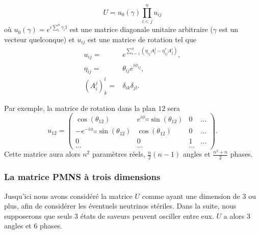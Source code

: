             \begin{equation}\label{eq::compact_pmns}
                U=u_0(\gamma)\prod_{i<j}^n u_{ij}
            \end{equation}
            où $u_0(\gamma)=e^{i \sum_{i}^{n}\gamma_i \mathbb{I}}$ est une matrice diagonale unitaire arbitraire ($\gamma$ est un vecteur quelconque) et $u_{ij}$ est une matrice de rotation tel que
            \begin{equation}
                \begin{split}
                    u_{ij}= & e^{\sum_{i=1}^n\left(\eta_{ij}A_i^j-\eta_{ij}^*A_j^i\right)},\\
                    \eta_{ij} = & \theta_{ij}e^{i\phi_{ij}},\\
                    \left(A_i^j\right)_k^l = & \delta_{ik}\delta_{jl}.
                \end{split}
            \end{equation}
            
            Par exemple, la matrice de rotation dans la plan $12$ sera
            \begin{equation}
                u_{12} = 
                \left(\begin{matrix}
                    \cos(\theta_{12}) & e^{i\phi_{12}}\sin(\theta_{12}) & 0 & ... \\
                    -e^{-i\phi_{12}}\sin(\theta_{12}) & \cos(\theta_{12}) & 0 & ... \\
                    0 & 0 & 1 & ... \\
                    ... & ... & ... &
                \end{matrix}\right).
            \end{equation}
            Cette matrice aura alors $n^2$ paramètres réels, $\frac{n}{2}(n-1)$ angles  et $\frac{n^2+n}{2}$ phases.
            
            \subsubsection{La matrice PMNS à trois dimensions}
            Jusqu'ici nous avons considéré la matrice $U$ comme ayant une dimension de 3 ou plus, afin de considérer les éventuels neutrinos stériles. Dans la suite, nous supposerons que seuls 3 états de saveurs peuvent osciller entre eux. $U$ a alors 3 angles et 6 phases.
            
